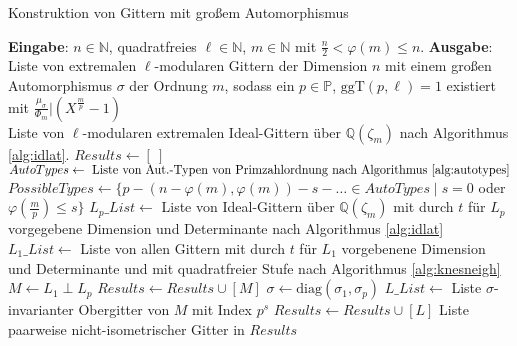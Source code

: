 \documentclass[12pt,a4paper,halfparskip,headsepline,bibtotocnumbered]{scrreprt}
\theoremstyle{nummermitklammern}
\theoremstyle{nonumberbreak}
\newcommand{\N}{\mathbb{N}}
\newcommand{\Q}{\mathbb{Q}}
\renewcommand{\P}{\mathbb{P}}
\newcommand{\ggT}{\text{ggT}}
\begin{document}
\begin{algorithm}[H]
	\caption{Konstruktion von Gittern mit großem Automorphismus}\label{alg:largeauto}
	\begin{algorithmic}[1]
		\State \textbf{Eingabe}: $n \in \N$, quadratfreies $\ell \in \N$, $m \in \N$ mit $\frac{n}{2} < \varphi(m) \leq n$.
		\State \textbf{Ausgabe}: Liste von extremalen $\ell$-modularen Gittern der Dimension $n$ mit einem großen Automorphismus $\sigma$ der Ordnung $m$, sodass ein $p \in \P$, $\ggT(p, \ell) = 1$ existiert mit $\frac{\mu_\sigma}{\Phi_m} \vert (X^\frac{m}{p}-1)$
		\\
		 \Return Liste von $\ell$-modularen extremalen Ideal-Gittern über $\Q(\zeta_m)$ nach Algorithmus \eqref{alg:idlat}. \EndIf
		\State $Results \gets [\ ]$
		\State $AutoTypes \gets \text{ Liste von Aut.-Typen von Primzahlordnung nach Algorithmus \eqref{alg:autotypes}}$
		\For {$p \in \lbrace q \in \P \mid q \vert m, \ggT(q, \ell) = 1 \rbrace$}
			\State $PossibleTypes \gets \lbrace p - (n - \varphi(m), \varphi(m)) - s - \dots \in AutoTypes \mid s = 0$ oder $\varphi(\frac{m}{p}) \leq s \rbrace$
				\State $L_p\_List \gets$ Liste von Ideal-Gittern über $\Q(\zeta_m)$ mit durch $t$ für $L_p$ vorgegebene Dimension und Determinante nach Algorithmus \eqref{alg:idlat}
					\State $L_1\_List \gets$ Liste von allen Gittern mit durch $t$ für $L_1$ vorgebenene Dimension und Determinante und mit quadratfreier Stufe nach Algorithmus \eqref{alg:knesneigh}
						\State $M \gets L_1 \perp L_p$
						 $Results \gets Results \cup [M]$ \EndIf
								\State $\sigma \gets \text{diag}(\sigma_1, \sigma_p)$
								\State $L\_List \gets$ Liste $\sigma$-invarianter Obergitter von $M$ mit Index $p^s$
									\State $Results \gets Results \cup [L]$		
								\EndFor
							\EndFor
						\EndFor
					\EndFor
				\EndFor
			\EndFor
		\EndFor
		\State \Return Liste paarweise nicht-isometrischer Gitter in $Results$
	\end{algorithmic}
\end{algorithm}
\end{document}
